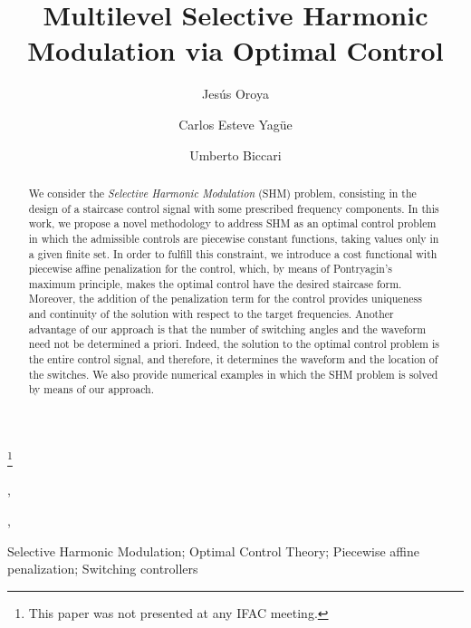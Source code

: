 \documentclass[twocolumn]{autart}    %
\begin{document}
	
\begin{frontmatter}
		
\title{Multilevel Selective Harmonic Modulation via Optimal Control} %
		
\thanks[footnoteinfo]{This paper was not presented at any IFAC meeting.}

\author[UD]{Jes\'us Oroya}  %
\author[UAM,FD]{Carlos Esteve Yagüe},               %
\author[FD,UD]{Umberto Biccari},    %

\address[UD]{Universidad de Deusto, Avenida de las Universidades 24, 48007 Bilbao, Spain.}  %
\address[FD]{Chair of Computational Mathematics, Fundaci\'on Deusto, Avenida de las Universidades 24, 48007 Bilbao, Spain.}  %
\address[UAM]{Departamento de Matem\'aticas, Universidad Aut\'onoma de Madrid, 28049 Madrid, Spain.}  %
		
\begin{keyword}
	Selective Harmonic Modulation; Optimal Control Theory;  Piecewise affine penalization; Switching controllers
\end{keyword}                             
		
\begin{abstract}
	We consider the \emph{Selective Harmonic Modulation} (SHM) problem, consisting in the design of a staircase control signal with some prescribed frequency components. In this work, we propose a novel methodology to  address SHM as an optimal control problem in which the admissible controls are piecewise constant functions, taking values only in a given finite set. In order to fulfill this constraint, we introduce a cost functional with piecewise affine penalization for the control, which, by means of Pontryagin's maximum principle, makes the optimal control have the desired staircase form.  Moreover, the addition of the penalization term for the control provides uniqueness and continuity of the solution with respect to the target frequencies. Another advantage of our approach is that the number of switching angles and the waveform need not  be determined a priori.  Indeed, the solution to the optimal control problem is the entire control signal, and therefore, it determines the waveform and the location of the switches. We also provide numerical examples in which the SHM problem is solved by means of our approach.
\end{abstract}
		
\end{frontmatter}
\end{document}
